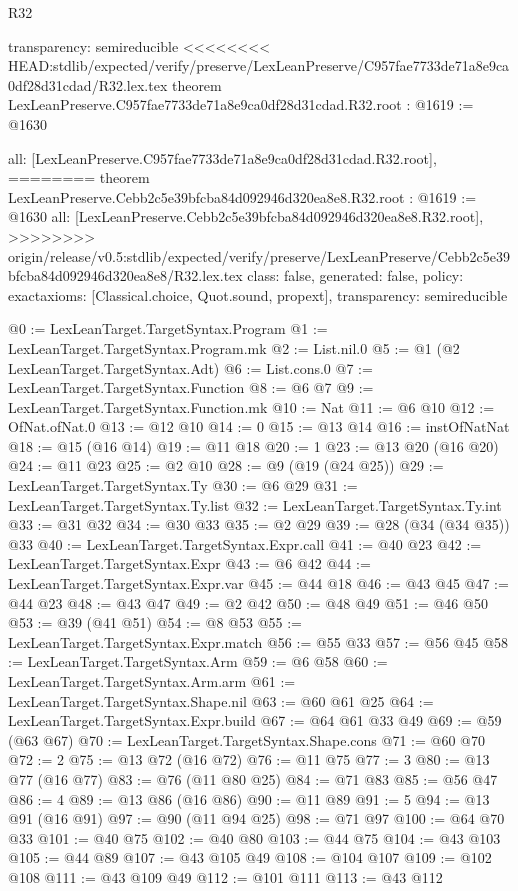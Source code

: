 \begin{lexlean}{R32}
\begin{coremodule}
{{{{{{{{{{{{  transparency: semireducible
}
<<<<<<<< HEAD:stdlib/expected/verify/preserve/LexLeanPreserve/C957fae7733de71a8e9ca0df28d31cdad/R32.lex.tex
theorem LexLeanPreserve.C957fae7733de71a8e9ca0df28d31cdad.R32.root : @1619 := @1630 {
  all: [LexLeanPreserve.C957fae7733de71a8e9ca0df28d31cdad.R32.root],
========
theorem LexLeanPreserve.Cebb2c5e39bfcba84d092946d320ea8e8.R32.root : @1619 := @1630 {
  all: [LexLeanPreserve.Cebb2c5e39bfcba84d092946d320ea8e8.R32.root],
>>>>>>>> origin/release/v0.5:stdlib/expected/verify/preserve/LexLeanPreserve/Cebb2c5e39bfcba84d092946d320ea8e8/R32.lex.tex
  class: false,
  generated: false,
  policy: exact{axioms: [Classical.choice, Quot.sound, propext]},
  transparency: semireducible
}

@0 := LexLeanTarget.TargetSyntax.Program
@1 := LexLeanTarget.TargetSyntax.Program.mk
@2 := List.nil.{0}
@5 := @1 (@2 LexLeanTarget.TargetSyntax.Adt)
@6 := List.cons.{0}
@7 := LexLeanTarget.TargetSyntax.Function
@8 := @6 @7
@9 := LexLeanTarget.TargetSyntax.Function.mk
@10 := Nat
@11 := @6 @10
@12 := OfNat.ofNat.{0}
@13 := @12 @10
@14 := 0
@15 := @13 @14
@16 := instOfNatNat
@18 := @15 (@16 @14)
@19 := @11 @18
@20 := 1
@23 := @13 @20 (@16 @20)
@24 := @11 @23
@25 := @2 @10
@28 := @9 (@19 (@24 @25))
@29 := LexLeanTarget.TargetSyntax.Ty
@30 := @6 @29
@31 := LexLeanTarget.TargetSyntax.Ty.list
@32 := LexLeanTarget.TargetSyntax.Ty.int
@33 := @31 @32
@34 := @30 @33
@35 := @2 @29
@39 := @28 (@34 (@34 @35)) @33
@40 := LexLeanTarget.TargetSyntax.Expr.call
@41 := @40 @23
@42 := LexLeanTarget.TargetSyntax.Expr
@43 := @6 @42
@44 := LexLeanTarget.TargetSyntax.Expr.var
@45 := @44 @18
@46 := @43 @45
@47 := @44 @23
@48 := @43 @47
@49 := @2 @42
@50 := @48 @49
@51 := @46 @50
@53 := @39 (@41 @51)
@54 := @8 @53
@55 := LexLeanTarget.TargetSyntax.Expr.match
@56 := @55 @33
@57 := @56 @45
@58 := LexLeanTarget.TargetSyntax.Arm
@59 := @6 @58
@60 := LexLeanTarget.TargetSyntax.Arm.arm
@61 := LexLeanTarget.TargetSyntax.Shape.nil
@63 := @60 @61 @25
@64 := LexLeanTarget.TargetSyntax.Expr.build
@67 := @64 @61 @33 @49
@69 := @59 (@63 @67)
@70 := LexLeanTarget.TargetSyntax.Shape.cons
@71 := @60 @70
@72 := 2
@75 := @13 @72 (@16 @72)
@76 := @11 @75
@77 := 3
@80 := @13 @77 (@16 @77)
@83 := @76 (@11 @80 @25)
@84 := @71 @83
@85 := @56 @47
@86 := 4
@89 := @13 @86 (@16 @86)
@90 := @11 @89
@91 := 5
@94 := @13 @91 (@16 @91)
@97 := @90 (@11 @94 @25)
@98 := @71 @97
@100 := @64 @70 @33
@101 := @40 @75
@102 := @40 @80
@103 := @44 @75
@104 := @43 @103
@105 := @44 @89
@107 := @43 @105 @49
@108 := @104 @107
@109 := @102 @108
@111 := @43 @109 @49
@112 := @101 @111
@113 := @43 @112
}}}}}}}}}}}}
\end{coremodule}
\end{lexlean}
